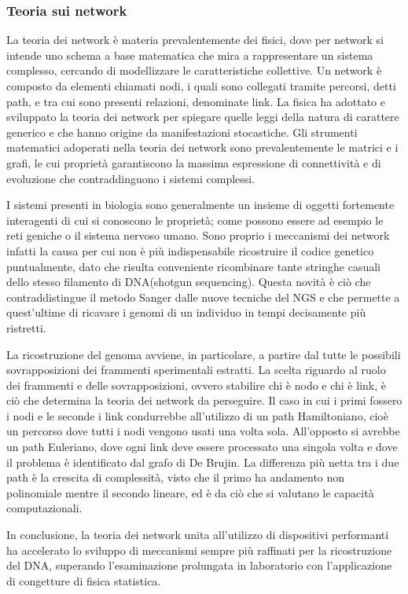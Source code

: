 \subsubsection{Teoria sui network}
La teoria dei network è materia prevalentemente dei fisici, dove per network si intende uno schema a base matematica che mira a rappresentare un sistema complesso, cercando di modellizzare le caratteristiche collettive. 
Un network è composto da elementi chiamati nodi, i quali sono collegati tramite percorsi, detti path, e tra cui sono presenti relazioni, denominate link. 
La fisica ha adottato e sviluppato la teoria dei network per spiegare quelle leggi della natura di carattere generico e che hanno origine da manifestazioni stocastiche.
Gli strumenti matematici adoperati nella teoria dei network sono prevalentemente le matrici e i grafi, le cui proprietà garantiscono la massima espressione di connettività e di evoluzione che contraddinguono i sistemi complessi. 

I sistemi presenti in biologia sono generalmente un insieme di oggetti fortemente interagenti di cui si conoscono le proprietà; come possono essere ad esempio le reti geniche o il sistema nervoso umano.
Sono proprio i meccanismi dei network infatti la causa per cui non è più indispensabile ricostruire il codice genetico puntualmente, dato che risulta conveniente ricombinare tante stringhe casuali dello stesso filamento di DNA(shotgun sequencing).
Questa novità è ciò che contraddistingue il metodo Sanger dalle nuove tecniche del NGS e che permette a quest'ultime di ricavare i genomi di un individuo in tempi decisamente più ristretti.

La ricostruzione del genoma avviene, in particolare, a partire dal tutte le possibili sovrapposizioni dei frammenti sperimentali estratti. 
La scelta riguardo al ruolo dei frammenti e delle sovrapposizioni, ovvero stabilire chi è nodo e chi è link, è ciò che determina la teoria dei network da perseguire.
Il caso in cui i primi fossero i nodi e le seconde i link condurrebbe all'utilizzo di un path Hamiltoniano, cioè un percorso dove tutti i nodi vengono usati una volta sola.
All'opposto si avrebbe un path Euleriano, dove ogni link deve essere processato una singola volta e dove il problema è identificato dal grafo di De Brujin.
La differenza più netta tra i due path è la crescita di complessità, visto che il primo ha andamento non polinomiale mentre il secondo lineare, ed è da ciò che si valutano le capacità computazionali.

In conclusione, la teoria dei network unita all'utilizzo di dispositivi performanti ha accelerato lo sviluppo di meccanismi sempre più raffinati per la ricostruzione del DNA, superando l'esaminazione prolungata in laboratorio con l'applicazione di congetture di fisica statistica.    

